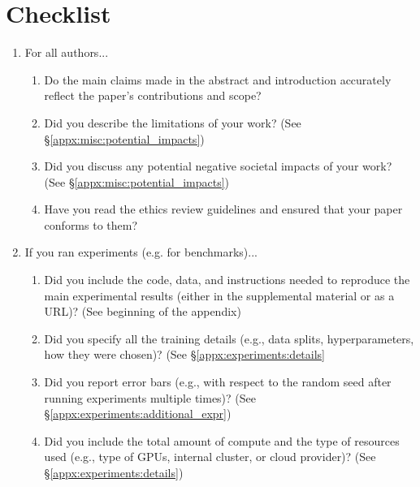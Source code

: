 \section*{Checklist}

\begin{enumerate}

\item For all authors...
\begin{enumerate}
  \item Do the main claims made in the abstract and introduction accurately reflect the paper's contributions and scope?
    \answerYes{}
  \item Did you describe the limitations of your work?
    \answerYes{} (See \S\ref{appx:misc:potential_impacts})
  \item Did you discuss any potential negative societal impacts of your work?
    \answerYes{} (See \S\ref{appx:misc:potential_impacts})
  \item Have you read the ethics review guidelines and ensured that your paper conforms to them?
    \answerYes{}
\end{enumerate}

\item If you ran experiments (e.g. for benchmarks)...
\begin{enumerate}
  \item Did you include the code, data, and instructions needed to reproduce the main experimental results (either in the supplemental material or as a URL)?
    \answerYes{} (See beginning of the appendix)
  \item Did you specify all the training details (e.g., data splits, hyperparameters, how they were chosen)?
    \answerYes{} (See \S\ref{appx:experiments:details}
  \item Did you report error bars (e.g., with respect to the random seed after running experiments multiple times)?
    \answerYes{} (See \S\ref{appx:experiments:additional_expr})
  \item Did you include the total amount of compute and the type of resources used (e.g., type of GPUs, internal cluster, or cloud provider)?
    \answerYes{} (See \S\ref{appx:experiments:details})
\end{enumerate}


\end{enumerate}
